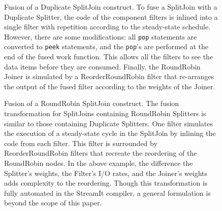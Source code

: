 \begin{figure}
\centering
{}
\caption{\protect\small Fusion of a Duplicate SplitJoin construct.  To
fuse a SplitJoin with a Duplicate Splitter, the code of the component
filters is inlined into a single filter with repetition according to
the steady-state schedule.  However, there are some modifications: all
{\tt pop} statements are converted to {\tt peek} statements, and the
{\tt pop}'s are performed at the end of the fused work function.  This
allows all the filters to see the data items before they are consumed.
Finally, the RoundRobin Joiner is simulated by a ReorderRoundRobin
filter that re-arranges the output of the fused filter according to
the weights of the Joiner.  \protect\label{fig:fuse-splitjoin1}}
\vspace{18pt}
\caption{\protect\small Fusion of a RoundRobin SplitJoin construct.
The fusion transformation for SplitJoins containing RoundRobin
Splitters is similar to those containing Duplicate Splitters.  One
filter simulates the execution of a steady-state cycle in the
SplitJoin by inlining the code from each filter.  This filter is
surrounded by ReorderRoundRobin filters that recreate the reordering of
the RoundRobin nodes.  In the above example, the difference the
Splitter's weights, the Filter's I/O rates, and the Joiner's weights
adds complexity to the reordering.  Though this transformation is
fully automated in the StreamIt compiler, a general formulation is
beyond the scope of this paper.  \protect\label{fig:fuse-splitjoin2}}
\end{figure}


